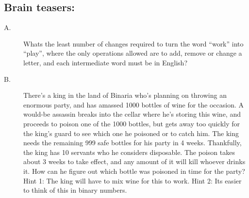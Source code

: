 \documentclass{article}
\begin{document}
\subsection*{Brain teasers:}
\begin{description}
\item[A.] Whats the least number of changes required to turn the word “work” into “play”, where the only operations allowed are to add, remove or change a letter, and each intermediate word must be in English? %

\item[B.] There's a king in the land of Binaria who’s planning on throwing an enormous party, and has amassed 1000 bottles of wine for the occasion. A would-be assassin breaks into the cellar where he’s storing this wine, and proceeds to poison one of the 1000 bottles, but gets away too quickly for the king's guard to see which one he poisoned or to catch him.
The king needs the remaining 999 safe bottles for his party in 4 weeks. Thankfully, the king has 10 servants who he considers disposable. The poison takes about 3 weeks to take effect, and any amount of it will kill whoever drinks it. How can he figure out which bottle was poisoned in time for the party?
Hint 1: The king will have to mix wine for this to work.
Hint 2: Its easier to think of this in binary numbers.

\end{description}
\end{document}
